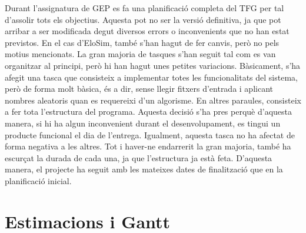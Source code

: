 \documentclass[a4paper]{article}
\begin{document}
Durant l'assignatura de GEP es fa una planificació completa del TFG per tal d'assolir tots els objectius. Aquesta pot no ser la versió definitiva, ja que pot arribar a ser modificada degut diversos errors o inconvenients que no han estat previstos. En el cas d'EloSim, també s'han hagut de fer canvis, però no pels motius mencionats. La gran majoria de tasques s'han seguit tal com es van organitzar al principi, però hi han hagut unes petites variacions. Bàsicament, s'ha afegit una tasca que consisteix a implementar totes les funcionalitats del sistema, però de forma molt bàsica, és a dir, sense llegir fitxers d'entrada i aplicant nombres aleatoris quan es requereixi d'un algorisme. En altres paraules, consisteix a fer tota l'estructura del programa. Aquesta decisió s'ha pres perquè d'aquesta manera, si hi ha algun inconvenient durant el desenvolupament, es tingui un producte funcional el dia de l'entrega. Igualment, aquesta tasca no ha afectat de forma negativa a les altres. Tot i haver-ne endarrerit la gran majoria, també ha escurçat la durada de cada una, ja que l'estructura ja està feta. D'aquesta manera, el projecte ha seguit amb les mateixes dates de finalització que en la planificació inicial.

\newpage
\section{Estimacions i Gantt}
\end{document}
